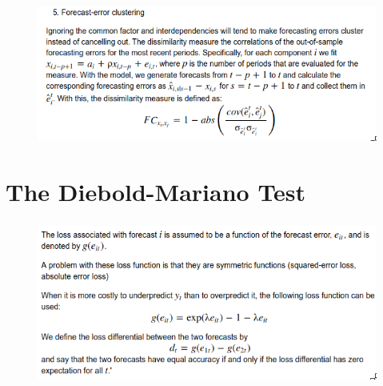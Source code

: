 \documentclass[c, dvipsnames]{beamer}  %
\begin{document}
\begin{frame}[shrink=5]
\frametitle{\insertsection} 
\framesubtitle{\insertsubsection}


\begin{figure}
	\centering
	\includegraphics[width=0.7\linewidth]{screenshot043}
	\label{fig:screenshot029}
\end{figure}


\end{frame}



\section{The Diebold-Mariano Test}


\begin{frame}[shrink=5]
\frametitle{\insertsection} 


\begin{figure}
	\centering
	\includegraphics[width=0.7\linewidth]{screenshot044}
	\label{fig:screenshot029}
\end{figure}






\end{frame}
\end{document}
